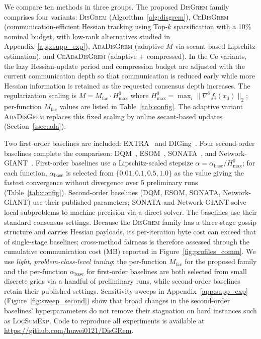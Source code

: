\documentclass[review,onefignum,onetabnum]{siamart171218}
\begin{document}
	We compare ten methods in three groups.
	The proposed \textsc{DisGrem} family comprises four variants:
	\textsc{DisGrem} (Algorithm~\ref{alg:disgrem}),
	\textsc{CeDisGrem} (communication-efficient Hessian tracking using
	Top-$k$ sparsification with a 10\% nominal budget, with low-rank
	alternatives studied in Appendix~\ref{app:supp_exp}),
	\textsc{AdaDisGrem} (adaptive $M$ via secant-based Lipschitz estimation),
	and \textsc{CeAdaDisGrem} (adaptive + compressed).
	In the Ce variants, the lazy Hessian-update period and compression
	budget are adjusted with the current communication depth so that
	communication is reduced early while more Hessian information is
	retained as the requested consensus depth increases.
	The regularization scaling is $M = M_{\mathrm{fac}}\cdot H_{\max}^{0}$ where
	$H_{\max}^{0} = \max_i \|\nabla^2 f_i(x_0)\|_2$;
	per-function $M_{\mathrm{fac}}$ values are listed in Table~\ref{tab:config}.
	The adaptive variant \textsc{AdaDisGrem} replaces this fixed scaling
	by online secant-based updates (Section~\ref{ssec:ada}).
	
	Two first-order baselines are included:
	EXTRA~\citep{shi2015extra} and
	DIGing~\citep{nedic2017diging}.
	Four second-order baselines complete the comparison:
	DQM~\citep{eisen2017dqn},
	ESOM~\citep{mokhtari2016esom},
	SONATA~\citep{sun2022sonata}, and
	Network-GIANT~\citep{maritan2023networkgiant}.
	First-order baselines use a Lipschitz-scaled stepsize
	$\alpha=\alpha_{\mathrm{base}}/H_{\max}^{0}$;
	for each function, $\alpha_{\mathrm{base}}$ is selected from
	$\{0.01, 0.1, 0.5, 1.0\}$ as the value giving the fastest
	convergence without divergence over 5 preliminary runs
	(Table~\ref{tab:config}).
	Second-order baselines (DQM, ESOM, SONATA, Network-GIANT) use their
	published parameters; SONATA and Network-GIANT solve local
	subproblems to machine precision via a direct solver.
	The baselines use their standard consensus settings.
	Because the \textsc{DisGrem} family has a three-stage gossip
	structure and carries Hessian payloads, its per-iteration byte cost
	can exceed that of single-stage baselines; cross-method fairness is
	therefore assessed through the cumulative communication cost (MB)
	reported in Figure~\ref{fig:profiles_comm}.
	We use \emph{light, problem-class-level tuning}:
	the per-function $M_{\mathrm{fac}}$ for the proposed family and the
	per-function $\alpha_{\mathrm{base}}$ for first-order baselines are
	both selected from small discrete grids via a handful of preliminary
	runs, while second-order baselines retain their published settings.
	Sensitivity sweeps in Appendix~\ref{app:supp_exp}
	(Figure~\ref{fig:sweep_second}) show that broad changes in the
	second-order baselines' hyperparameters do not remove their stagnation
	on hard instances such as \textsc{LogSumExp}.
	Code to reproduce all experiments is available at
	\url{https://github.com/huwei0121/DisGRem}.
	
\end{document}
